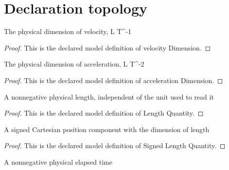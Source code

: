 \section{Declaration topology}
\begin{definition}
  \label{def:physics:phyx-mini-0747:phyxminiproblems-problemphyxmini0747-velocitydimension}
  The physical dimension of velocity, L T\textasciicircum{}-1
\end{definition}
\begin{proof}
  This is the declared model definition of velocity Dimension.
\end{proof}
\begin{definition}
  \label{def:physics:phyx-mini-0747:phyxminiproblems-problemphyxmini0747-accelerationdimension}
  The physical dimension of acceleration, L T\textasciicircum{}-2
\end{definition}
\begin{proof}
  This is the declared model definition of acceleration Dimension.
\end{proof}
\begin{definition}
  \label{def:physics:phyx-mini-0747:phyxminiproblems-problemphyxmini0747-lengthquantity}
  A nonnegative physical length, independent of the unit used to read it
\end{definition}
\begin{proof}
  This is the declared model definition of Length Quantity.
\end{proof}
\begin{definition}
  \label{def:physics:phyx-mini-0747:phyxminiproblems-problemphyxmini0747-signedlengthquantity}
  A signed Cartesian position component with the dimension of length
\end{definition}
\begin{proof}
  This is the declared model definition of Signed Length Quantity.
\end{proof}
\begin{definition}
  \label{def:physics:phyx-mini-0747:phyxminiproblems-problemphyxmini0747-timequantity}
  A nonnegative physical elapsed time
\end{definition}
